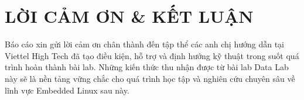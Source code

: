 \documentclass[12pt, a4paper]{article}
\begin{document}
\newpage
\section*{LỜI CẢM ƠN \& KẾT LUẬN}
Báo cáo xin gửi lời cảm ơn chân thành đến tập thể các anh chị hướng dẫn tại Viettel High Tech đã tạo điều kiện, hỗ trợ và định hướng kỹ thuật trong suốt quá trình hoàn thành bài lab. Những kiến thức thu nhận được từ bài lab Data Lab này sẽ là nền tảng vững chắc cho quá trình học tập và nghiên cứu chuyên sâu về lĩnh vực Embedded Linux sau này.
\end{document}
